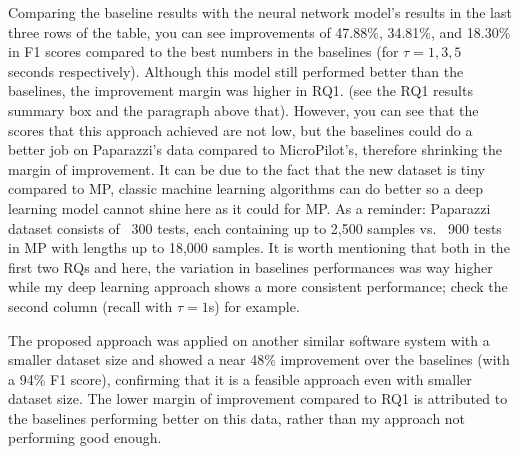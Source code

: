 Comparing the baseline results with the neural network model's results in the last three rows of the table, you can see improvements of 47.88\%, 34.81\%, and 18.30\% in F1 scores compared to the best numbers in the baselines (for $\tau = 1, 3, 5$ seconds respectively). Although this model still performed better than the baselines, the improvement margin was higher in RQ1. (see the RQ1 results summary box and the paragraph above that). %
However, you can see that the scores that this approach achieved are not low, but the baselines could do a better job on Paparazzi's data compared to MicroPilot's, therefore shrinking the margin of improvement. 
It can be due to the fact that the new dataset is tiny compared to MP, classic machine learning algorithms can do better so a deep learning model cannot shine here as it could for MP. 
As a reminder: Paparazzi dataset consists of ~300 tests, each containing up to 2,500 samples vs. ~900 tests in MP with lengths up to 18,000 samples. 
It is worth mentioning that both in the first two RQs and here, the variation in baselines performances was way higher while my deep learning approach shows a more consistent performance; check the second column (recall with $\tau=1$s) for example. 

\begin{rqanswer}
The proposed approach was applied on another similar software system with a smaller dataset size and showed a near 48\% improvement over the baselines (with a 94\% F1 score), confirming that it is a feasible approach even with smaller dataset size. The lower margin of improvement compared to RQ1 is attributed to the baselines performing better on this data, rather than my approach not performing good enough.
\end{rqanswer}

